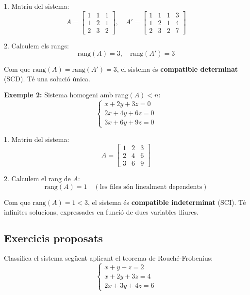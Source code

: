 \documentclass[12pt]{article}
\begin{document}
\begin{exemple}
1. Matriu del sistema:
\[
A =
\begin{bmatrix}
1 & 1 & 1 \\
1 & 2 & 1 \\
2 & 3 & 2
\end{bmatrix}, \quad
A' =
\begin{bmatrix}
1 & 1 & 1 & 3 \\
1 & 2 & 1 & 4 \\
2 & 3 & 2 & 7
\end{bmatrix}
\]

2. Calculem els rangs:
\[
\text{rang}(A) = 3, \quad \text{rang}(A') = 3
\]

Com que \( \text{rang}(A) = \text{rang}(A') = 3 \), el sistema és \textbf{compatible determinat} (SCD). Té una solució única.
\end{exemple}

\begin{exemple}
\textbf{Exemple 2:} Sistema homogeni amb \( \text{rang}(A) < n \):
\[
\begin{cases}
x + 2y + 3z = 0 \\
2x + 4y + 6z = 0 \\
3x + 6y + 9z = 0
\end{cases}
\]

1. Matriu del sistema:
\[
A =
\begin{bmatrix}
1 & 2 & 3 \\
2 & 4 & 6 \\
3 & 6 & 9
\end{bmatrix}
\]

2. Calculem el rang de \(A\):
\[
\text{rang}(A) = 1 \quad (\text{les files són linealment dependents})
\]

Com que \( \text{rang}(A) = 1 < 3 \), el sistema és \textbf{compatible indeterminat} (SCI). Té infinites solucions, expressades en funció de dues variables lliures.
\end{exemple}

\subsection*{Exercicis proposats}
\begin{exercici}
Classifica el sistema següent aplicant el teorema de Rouché-Frobenius:
\[
\begin{cases}
x + y + z = 2 \\
x + 2y + 3z = 4 \\
2x + 3y + 4z = 6
\end{cases}
\]
\end{exercici}
\end{document}
